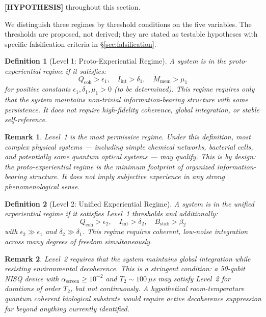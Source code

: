 \documentclass[12pt,letterpaper]{article}
\newtheorem{definition}{Definition}[section]
\newtheorem{remark}{Remark}[section]
\newcommand{\HYPOTHESIS}[1]{\textcolor{blue!70!black}{\textbf{[HYPOTHESIS]}} #1}
\newcommand{\Qcoh}{Q_{\mathrm{coh}}}
\newcommand{\Iint}{I_{\mathrm{int}}}
\newcommand{\Mmem}{M_{\mathrm{mem}}}
\newcommand{\Bstab}{B_{\mathrm{stab}}}
\begin{document}
\HYPOTHESIS{} throughout this section.

We distinguish three regimes by threshold conditions on the five variables.
The thresholds are proposed, not derived; they are stated as testable
hypotheses with specific falsification criteria in \S\ref{sec:falsification}.

\begin{definition}[Level 1: Proto-Experiential Regime]
\label{def:level1}
A system is in the \emph{proto-experiential regime} if it satisfies:
\begin{equation}
  \Qcoh > \epsilon_1, \quad \Iint > \delta_1, \quad \Mmem > \mu_1
  \label{eq:level1_thresholds}
\end{equation}
for positive constants $\epsilon_1, \delta_1, \mu_1 > 0$ (to be determined).
This regime requires only that the system maintains non-trivial
information-bearing structure with some persistence. It does not require
high-fidelity coherence, global integration, or stable self-reference.
\end{definition}

\begin{remark}
Level~1 is the most permissive regime. Under this definition, most
complex physical systems --- including simple chemical networks, bacterial
cells, and potentially some quantum optical systems --- may qualify.
This is by design: the proto-experiential regime is the minimum footprint
of organized information-bearing structure. It does not imply subjective
experience in any strong phenomenological sense.
\end{remark}

\begin{definition}[Level 2: Unified Experiential Regime]
\label{def:level2}
A system is in the \emph{unified experiential regime} if it satisfies
Level~1 thresholds and additionally:
\begin{equation}
  \Qcoh > \epsilon_2, \quad \Iint > \delta_2, \quad \Bstab > \beta_2
  \label{eq:level2_thresholds}
\end{equation}
with $\epsilon_2 \gg \epsilon_1$ and $\delta_2 \gg \delta_1$.
This regime requires coherent, low-noise integration across many degrees
of freedom simultaneously.
\end{definition}

\begin{remark}
Level~2 requires that the system maintains global integration while resisting
environmental decoherence. This is a stringent condition: a 50-qubit NISQ
device with $\alpha_{\mathrm{screen}} \geq 10^{-2}$ and $T_2 \sim 100~\mu$s
may satisfy Level~2 for durations of order $T_2$, but not continuously.
A hypothetical room-temperature quantum coherent biological substrate would
require active decoherence suppression far beyond anything currently identified.
\end{remark}
\end{document}
